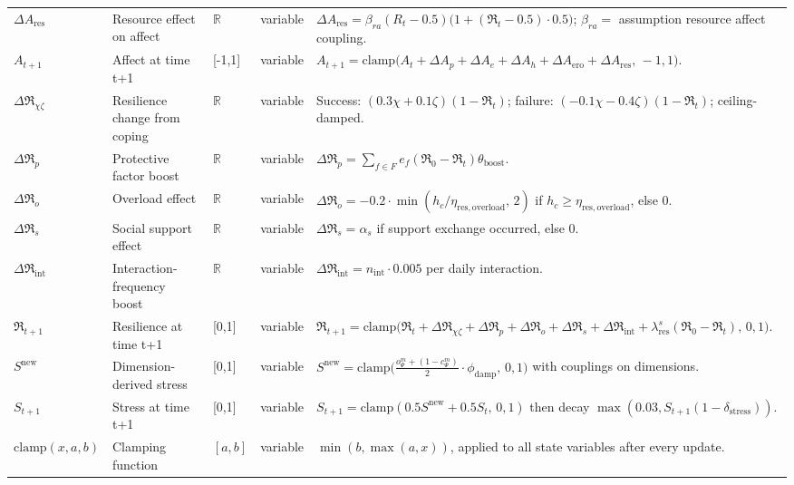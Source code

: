 \documentclass[
  letterpaper,
  DIV=11,
  numbers=noendperiod]{scrartcl}
\begin{document}
\begin{longtable}{lp{2.4cm}p{1.6cm}p{1.7cm}p{5.2cm}}
$\Delta A_{\mathrm{res}}$ & Resource effect on affect & $\mathbb{R}$ & variable & $\Delta A_{\mathrm{res}} = \beta_{ra}(R_t - 0.5)\big(1 + (\mathfrak{R}_t - 0.5)\cdot 0.5\big)$; $\beta_{ra} = $ assumption resource affect coupling. \\
$A_{t+1}$ & Affect at time t+1 & [-1,1] & variable & $A_{t+1} = \mathrm{clamp}\big(A_t + \Delta A_p + \Delta A_e + \Delta A_h + \Delta A_{\mathrm{ero}} + \Delta A_{\mathrm{res}},\, -1, 1\big)$. \\
$\Delta \mathfrak{R}_{\chi\zeta}$ & Resilience change from coping & $\mathbb{R}$ & variable & Success: $(0.3\chi + 0.1\zeta)(1 - \mathfrak{R}_t)$; failure: $(-0.1\chi - 0.4\zeta)(1 - \mathfrak{R}_t)$; ceiling-damped. \\
$\Delta \mathfrak{R}_p$ & Protective factor boost & $\mathbb{R}$ & variable & $\Delta \mathfrak{R}_p = \sum_{f \in F} e_f (\mathfrak{R}_0 - \mathfrak{R}_t) \theta_{\mathrm{boost}}$. \\
$\Delta \mathfrak{R}_o$ & Overload effect & $\mathbb{R}$ & variable & $\Delta \mathfrak{R}_o = -0.2 \cdot \min(h_c / \eta_{\mathrm{res,overload}},\, 2)$ if $h_c \geq \eta_{\mathrm{res,overload}}$, else 0. \\
$\Delta \mathfrak{R}_s$ & Social support effect & $\mathbb{R}$ & variable & $\Delta \mathfrak{R}_s = \alpha_s$ if support exchange occurred, else 0. \\
$\Delta \mathfrak{R}_{\mathrm{int}}$ & Interaction-frequency boost & $\mathbb{R}$ & variable & $\Delta \mathfrak{R}_{\mathrm{int}} = n_{\mathrm{int}} \cdot 0.005$ per daily interaction. \\
$\mathfrak{R}_{t+1}$ & Resilience at time t+1 & [0,1] & variable & $\mathfrak{R}_{t+1} = \mathrm{clamp}\big(\mathfrak{R}_t + \Delta\mathfrak{R}_{\chi\zeta} + \Delta\mathfrak{R}_p + \Delta\mathfrak{R}_o + \Delta\mathfrak{R}_s + \Delta\mathfrak{R}_{\mathrm{int}} + \lambda_{\mathrm{res}}^s(\mathfrak{R}_0 - \mathfrak{R}_t),\, 0, 1\big)$. \\
$S^{\mathrm{new}}$ & Dimension-derived stress & [0,1] & variable & $S^{\mathrm{new}} = \mathrm{clamp}\big(\tfrac{o_{\Psi}^{m} + (1 - c_{\Psi}^{m})}{2} \cdot \phi_{\mathrm{damp}},\, 0, 1\big)$ with couplings on dimensions. \\
$S_{t+1}$ & Stress at time t+1 & [0,1] & variable & $S_{t+1} = \mathrm{clamp}(0.5 S^{\mathrm{new}} + 0.5 S_t,\, 0, 1)$ then decay $\max(0.03, S_{t+1}(1 - \delta_{\mathrm{stress}}))$. \\
$\mathrm{clamp}(x,a,b)$ & Clamping function & $[a,b]$ & variable & $\min(b, \max(a, x))$, applied to all state variables after every update. \\
\bottomrule

\end{longtable}
\end{document}
